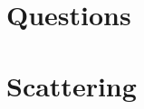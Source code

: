 \documentclass[english, parskip=full]{scrartcl}
\title{\titel}
\author{\autor}
\date{\today}
\begin{document}
\maketitle  %
\section{Questions}
\section{Scattering}
\end{document}
